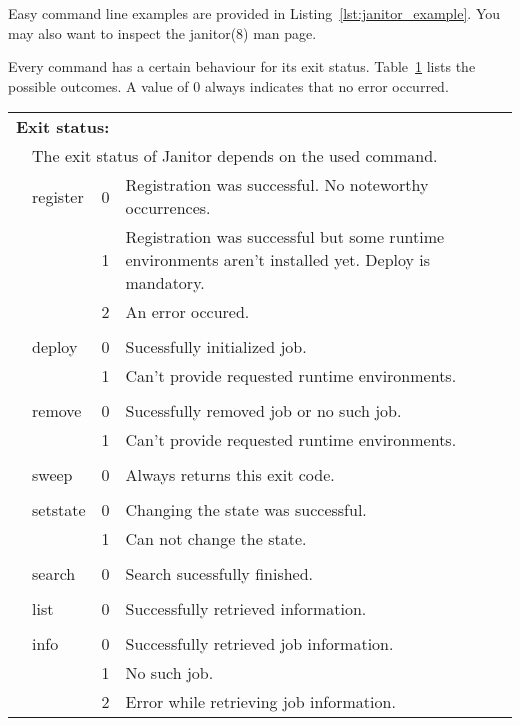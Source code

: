 Easy command line examples are provided in Listing~\ref{lst:janitor_example}.
You may also want to inspect the janitor(8) man page.

Every command has a certain behaviour for its exit status.
Table~\ref{tab:janitor_commandline_exit_status} lists the possible
outcomes. A value of 0 always indicates that no error occurred.

\begin{table}[!h]
   \begin{center}
        \label{tab:janitor_commandline_exit_status}
	\begin{tabular}{p{0.5cm}p{2cm}p{0.5cm}p{11cm}}
	\multicolumn{3}{l}{\textbf{Exit status:}} \\
	&\multicolumn{3}{l}{The exit status of Janitor depends on the used command.} \\
	&	register			& 0 & Registration was successful. No noteworthy occurrences.\\
	&					& 1 & Registration was successful but some runtime environments aren't installed yet. Deploy is mandatory.\\ 
	&					& 2 & An error occured.\\
	&					&   &\\
	&	deploy				& 0 & Sucessfully initialized job.\\
	&					& 1 & Can't provide requested runtime environments.\\ 
	&					&   &\\
	&	remove				& 0 & Sucessfully removed job or no such job.\\
	&					& 1 & Can't provide requested runtime environments.\\ 
	&					&   &\\
	&	sweep				& 0 & Always returns this exit code.\\
	&					&   &\\
	&	setstate			& 0 & Changing the state was successful.\\
	&					& 1 & Can not change the state.\\ 
	&					&   &\\
	&	search				& 0 & Search sucessfully finished.\\
	&					&   &\\
	&	list				& 0 & Successfully retrieved information.\\
	&					&   &\\
	&	info				& 0 & Successfully retrieved job information.\\
	&					& 1 & No such job.\\ 
	&					& 2 & Error while retrieving job information.\\
	\end{tabular} 
   \end{center}
\end{table}


